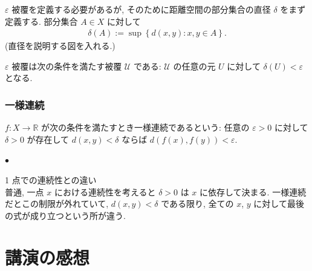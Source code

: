 \documentclass[openany, a4paper, oneside]{book}
\newcounter{enum2}
\renewenvironment{itemize}{%
\begin{list}{$\bullet$\ \ }%
{%
\usecounter{enum2}
\setlength{\itemindent}{0pt}%
\setlength{\leftmargin}{6pt}%
\setlength{\rightmargin}{0pt}%
\setlength{\labelsep}{0pt}%
\setlength{\labelwidth}{6pt}%
\setlength{\itemsep}{0pt}%
\setlength{\parsep}{0pt}%
\setlength{\listparindent}{0pt}%
}
}{%
\end{list}%
}
\theoremstyle{break}
\theoremstyle{breakdefn}
\begin{document}
$\varepsilon$ 被覆を定義する必要があるが, そのために距離空間の部分集合の直径 $\delta$ をまず定義する.
部分集合 $A \in X$ に対して
\begin{align}
 \delta (A)
 :=
 \sup \left\{ d (x, y) : x, y \in A \right\}.
\end{align}
(直径を説明する図を入れる.)

$\varepsilon$ 被覆は次の条件を満たす被覆 $\mathcal{U}$ である:
$\mathcal{U}$ の任意の元 $U$ に対して $\delta (U) < \varepsilon$ となる.
\subsubsection{一様連続}
\label{sec-11-3-17-4-6}

$f \colon X \to \mathbb{R}$ が次の条件を満たすとき一様連続であるという:
任意の $\varepsilon > 0$ に対して $\delta > 0$ が存在して $d (x, y) < \delta$ ならば $d (f (x), f (y)) < \varepsilon$.
\begin{itemize}

\item 1 点での連続性との違い\\
\label{sec-11-3-17-4-6-1}%
普通, 一点 $x$ における連続性を考えると $\delta > 0$ は $x$ に依存して決まる.
一様連続だとこの制限が外れていて, $d (x, y) < \delta$ である限り, 全ての $x$, $y$ に対して最後の式が成り立つという所が違う.
\end{itemize} %
\section{講演の感想}
\label{sec-11-3-18}
\end{document}
